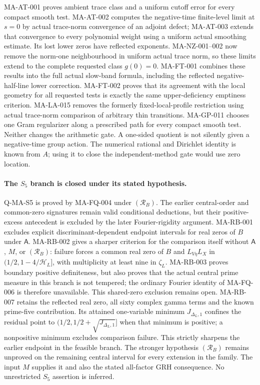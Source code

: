\documentclass[11pt,a4paper]{article}
\begin{document}
MA-AT-001 proves ambient trace class and a uniform cutoff error
for every compact smooth test. MA-AT-002 computes the negative-time
finite-level limit at $s=0$ by actual trace-norm convergence of
an adjoint defect; MA-AT-003 extends that convergence to every
polynomial weight using a uniform actual smoothing estimate.
Its lost lower zeros have reflected exponents. MA-NZ-001--002
now remove the norm-one neighbourhood in uniform actual trace norm,
so these limits extend to the complete requested class $g(0)=0$.
MA-FT-001 combines these results into the full actual slow-band
formula, including the reflected negative-half-line lower correction.
MA-FT-002 proves that its agreement with the local geometry for all
requested tests is exactly the same upper-deficiency emptiness criterion.
MA-LA-015 removes the formerly fixed-local-profile restriction
using actual trace-norm comparison of arbitrary thin transitions.
MA-GP-011 chooses one Gram regularizer along a prescribed path
for every compact smooth test. Neither changes the arithmetic gate.
A one-sided quotient is not silently given a negative-time group action.
The numerical rational and Dirichlet identity is known from $A$;
using it to close the independent-method gate would use zero location.

\paragraph{The $S_5$ branch is closed under its stated hypothesis.}
Q-MA-S5 is proved by MA-FQ-004 under $(\mathcal R_B)$.
The earlier central-order and common-zero signatures remain
valid conditional deductions, but their positive-excess
antecedent is excluded by the later Fourier-rigidity argument.
MA-RB-001 excludes explicit discriminant-dependent endpoint
intervals for real zeros of $B$ under $\mathsf A$.
MA-RB-002 gives a sharper criterion for the comparison itself
without $\mathsf A$, $M$, or $(\mathcal R_B)$: failure forces a
common real zero of $B$ and $L_{V\eta}L_X$ in
$(1/2,1-4/\mathcal H_L]$, with multiplicity at least nine in
$\zeta_L$. MA-RB-003 proves boundary positive definiteness, but
also proves that the actual central prime measure in this branch
is not tempered; the ordinary Fourier identity of MA-FQ-006 is
therefore unavailable. This shared-zero exclusion remains open.
MA-RB-007 retains the reflected real zero, all sixty complex
gamma terms and the known prime-five contribution. Its attained
one-variable minimum $J_{\Delta_L,1}$ confines the residual
point to $(1/2,1/2+\sqrt{J_{\Delta_L,1}}]$ when that minimum
is positive; a nonpositive minimum excludes comparison failure.
This strictly sharpens the earlier endpoint in the feasible branch.
The stronger hypothesis $(\mathcal R_B)$ remains unproved on
the remaining central interval for every extension in the family.
The input $M$ supplies it and also the stated all-factor GRH
consequence. No unrestricted $S_5$ assertion is inferred.
\end{document}
